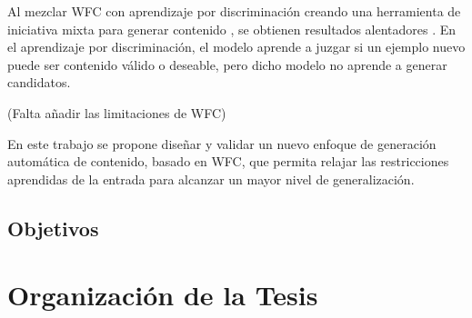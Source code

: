 Al mezclar WFC con aprendizaje por discriminación \cite{bib:12}
creando una herramienta de iniciativa mixta 
para generar contenido \cite{bib:4},
se obtienen resultados
alentadores \cite{bib:3}. En el aprendizaje por 
discriminación, el modelo aprende a juzgar si un ejemplo nuevo
puede ser contenido válido o deseable, pero dicho modelo no aprende
a generar candidatos.

(Falta añadir las limitaciones de WFC)

En este trabajo se propone diseñar y validar un nuevo enfoque de generación
automática de contenido, basado en WFC, que permita relajar las restricciones 
aprendidas de la entrada para alcanzar un mayor nivel de generalización.

\subsection*{Objetivos}

\section*{Organización de la Tesis}

